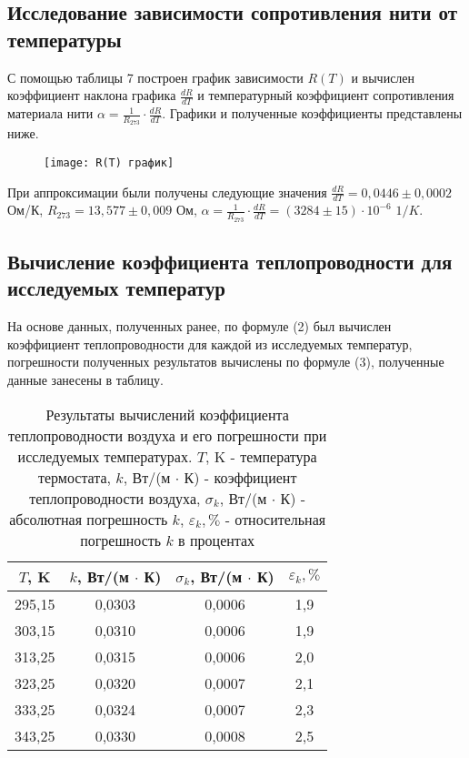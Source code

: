 \documentclass[a4paper,14pt]{article}
\begin{document}
\subsection{Исследование зависимости сопротивления нити от температуры}

С помощью таблицы 7 построен график зависимости $R(T)$ и вычислен коэффициент наклона графика $\frac{dR}{dT}$ и температурный коэффициент сопротивления материала нити $\alpha = \frac{1}{R_{273}} \cdot \frac{dR}{dT}$. Графики и полученные коэффициенты представлены ниже.

\begin{center}
\begin{figure}[H]
\texttt{[image: R(T) график]}
\label{1}
\end{figure}
\end{center}

При аппроксимации были получены следующие значения $\frac{dR}{dT} = 0,0446 \pm 0,0002$ Ом/К, $R_{273} = 13,577 \pm 0,009$ Ом, $\alpha = \frac{1}{R_{273}} \cdot \frac{dR}{dT} = (3284 \pm 15) \cdot 10^{-6}$ $1/K$.

\subsection{Вычисление коэффициента теплопроводности для исследуемых температур}

На основе данных, полученных ранее, по формуле (2) был вычислен коэффициент теплопроводности для каждой из исследуемых температур, погрешности полученных результатов вычислены по формуле (3), полученные данные занесены в таблицу.

\begin{table}[H]
\caption{Результаты вычислений коэффициента теплопроводности воздуха и его погрешности при исследуемых температурах. $T$, K - температура термостата, $k$, Вт/(м $\cdot$ К) - коэффициент теплопроводности воздуха, $\sigma_k$, Вт/(м $\cdot$ К) - абсолютная погрешность $k$, $\varepsilon_k, \%$ - относительная погрешность $k$ в процентах}
\label{}
\begin{tabular}{|c|c|c|c|}
\hline
$T$, K   & $k$, Вт/(м $\cdot$ К) & $\sigma_k$, Вт/(м $\cdot$ К)	 & $\varepsilon_k, \%$ \\ \hline
295,15 & 0,0303 & 0,0006        & 1,9         \\ \hline
303,15 & 0,0310 & 0,0006        & 1,9         \\ \hline
313,25 & 0,0315 & 0,0006        & 2,0         \\ \hline
323,25 & 0,0320 & 0,0007        & 2,1         \\ \hline
333,25 & 0,0324 & 0,0007        & 2,3         \\ \hline
343,25 & 0,0330 & 0,0008        & 2,5         \\ \hline
\end{tabular}
\end{table}
\end{document}
